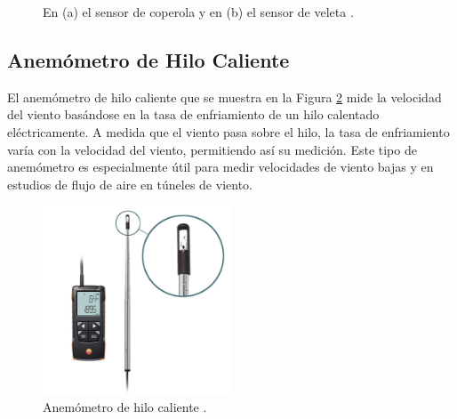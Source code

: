 \begin{figure}[H]
\begin{minipage}[b]{0.4\textwidth}
    \end{minipage}%
    \caption{En (a) el sensor de coperola y en (b) el sensor de veleta \cite{siapmicros2024}.}
    \label{fig:copas_y_veleta}
\end{figure}
\subsection*{Anemómetro de Hilo Caliente}

El anemómetro de hilo caliente que se muestra en la Figura \ref{fig:hiloCaliente} mide la velocidad del viento basándose en la tasa de enfriamiento de un hilo calentado eléctricamente. A medida que el viento pasa sobre el hilo, la tasa de enfriamiento varía con la velocidad del viento, permitiendo así su medición. Este tipo de anemómetro es especialmente útil para medir velocidades de viento bajas y en estudios de flujo de aire en túneles de viento.

\begin{figure}[H]
    \centering
    \includegraphics[width=0.5\textwidth]{Figuras/viento/sensores/hiloCaliente.png}
    \caption{Anemómetro de hilo caliente \cite{testoAnemometer}.}
    \label{fig:hiloCaliente}
\end{figure}

